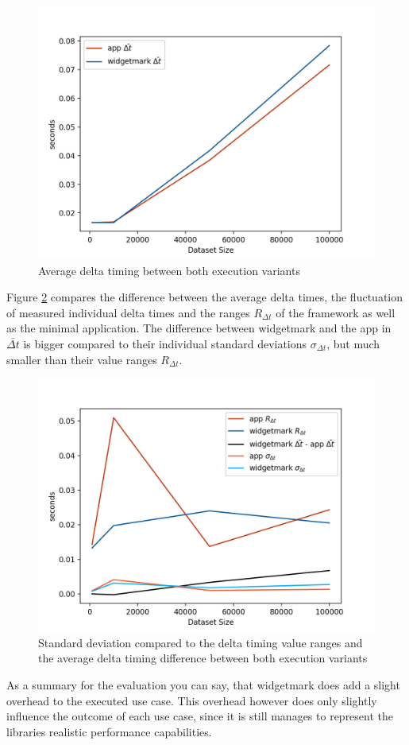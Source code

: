 \begin{figure}[h]
    \centering
    \includegraphics[width=12cm]{resources/img/evaluation/Eval_AVG}
    \caption{Average delta timing between both execution variants}
    \label{fig:evaluation:avg}
\end{figure}

Figure \ref{fig:evaluation:std} compares the difference between the average
delta times, the fluctuation of measured individual delta times and the ranges
$R_{\Delta t}$ of the framework as well as the minimal application. The
difference between widgetmark and the app in $\bar{\Delta t}$ is bigger compared
to their individual standard deviations $\sigma_{\Delta t}$, but much smaller
than their value ranges $R_{\Delta t}$.

\begin{figure}[h]
    \centering
    \includegraphics[width=12cm]{resources/img/evaluation/Eval_STD}
    \caption{Standard deviation compared to the delta timing value ranges and
        the average delta timing difference between both execution variants}
    \label{fig:evaluation:std}
\end{figure}

As a summary for the evaluation you can say, that widgetmark does add a slight
overhead to the executed use case. This overhead however does only slightly
influence the outcome of each use case, since it is still manages to represent
the libraries realistic performance capabilities.
